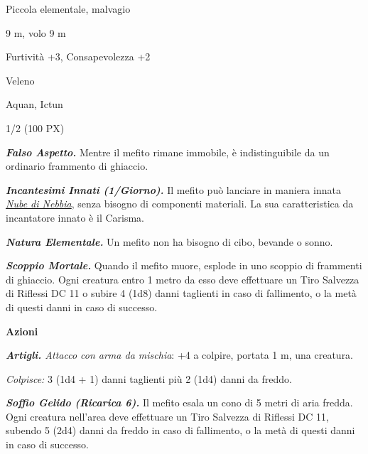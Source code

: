 \begin{multicols}{2}
{
\begin{description}[noitemsep, topsep=0pt, parsep=0pt, partopsep=0pt, itemsep=1pt, leftmargin=2.35cm,  labelwidth=2.2cm, itemindent=0cm, listparindent=0pt] %
\setlength{\baselineskip}{10pt}
\item[\textbf{Taglia/Tipo}] Piccola elementale, malvagio
\item[\textbf{Caratt.}] 
\item[\textbf{Punti Ferita}] 
\item[\textbf{Movimento}] 9 m, volo 9 m
\item[\textbf{Tiri Salvez.}] 
\item[\textbf{Comp.}] Furtività +3, Consapevolezza +2
\item[\textbf{Imm. Danni}] Veleno
\item[\textbf{Sensi}] 
\item[\textbf{Linguaggi}] Aquan, Ictun
\item[\textbf{Sfida}] 1/2 (100 PX)
\end{description}
\smallskip

\emph{\textbf{Falso Aspetto.}} Mentre il mefito rimane immobile, è indistinguibile da un ordinario frammento di ghiaccio.

\emph{\textbf{Incantesimi Innati (1/Giorno).}} Il mefito può lanciare in maniera innata \emph{\hyperlink{Nube di Nebbia}{Nube di Nebbia}}, senza bisogno di componenti materiali. La sua caratteristica da incantatore innato è il Carisma.

\emph{\textbf{Natura Elementale.}} Un mefito non ha bisogno di cibo, bevande o sonno.

\emph{\textbf{Scoppio Mortale.}} Quando il mefito muore, esplode in uno scoppio di frammenti di ghiaccio. Ogni creatura entro 1 metro da esso deve effettuare un Tiro Salvezza di Riflessi DC 11 o subire 4 (1d8) danni taglienti in caso di fallimento, o la metà di questi danni in caso
di successo.

\textbf{Azioni}

\emph{\textbf{Artigli.} Attacco con arma da mischia}: +4 a colpire, portata 1 m, una creatura.

\emph{Colpisce:} 3 (1d4 + 1) danni taglienti più 2 (1d4) danni da freddo.

\emph{\textbf{Soffio Gelido (Ricarica 6).}} Il mefito esala un cono di 5 metri di aria fredda. Ogni creatura nell'area deve effettuare un Tiro Salvezza di Riflessi DC 11, subendo 5 (2d4) danni da freddo in caso di fallimento, o la metà di questi danni in caso di successo.

}
\end{multicols}
